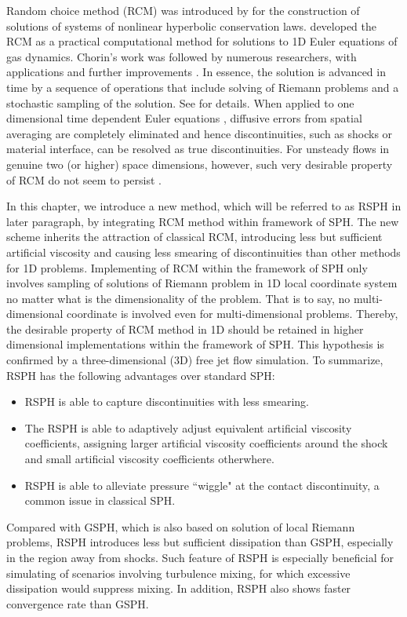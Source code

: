 Random choice method (RCM) was introduced by \citet{glimm1965solutions} for the construction of solutions of systems of nonlinear hyperbolic conservation laws. \citet{chorin1976random} developed the RCM as a practical computational method for solutions to 1D Euler equations of gas dynamics. Chorin's work was followed by numerous researchers, with applications and further improvements \citep{sod1977numerical, concus1979numerical,colella1982glimm, freistuhler1992numerical}. In essence, the solution is advanced in time by a sequence of operations that include solving of Riemann problems and a stochastic sampling of the solution. See \citep{toro2013riemann} for details. When applied to one dimensional time dependent Euler equations \citep{colella1982glimm}, diffusive errors from spatial averaging are completely eliminated and hence discontinuities, such as shocks or material interface, can be resolved as true discontinuities.
For unsteady flows in genuine two (or higher) space dimensions, however, such very desirable property of RCM do not seem to persist \citep{colella1982glimm}.

In this chapter, we introduce a new method, which will be referred to as RSPH in later paragraph, by integrating RCM method within framework of SPH. 
The new scheme inherits the attraction of classical RCM, introducing less but sufficient artificial viscosity and causing less smearing of discontinuities than other methods for 1D problems. Implementing of RCM within the framework of SPH only involves sampling of solutions of Riemann problem in 1D local coordinate system no matter what is the dimensionality of the problem. That is to say, no multi-dimensional coordinate is involved even for multi-dimensional problems. Thereby, the desirable property of RCM method in 1D should be retained in higher dimensional implementations within the framework of SPH. This hypothesis is confirmed by a three-dimensional (3D) free jet flow simulation. 
To summarize, RSPH has the following advantages over standard SPH:
\begin{itemize}
\item RSPH is able to capture discontinuities with less smearing.
\item The RSPH is able to adaptively adjust equivalent artificial viscosity coefficients, assigning larger artificial viscosity coefficients around the shock and small artificial viscosity coefficients otherwhere.
\item RSPH is able to alleviate pressure ``wiggle" at the contact discontinuity, a common issue in classical SPH.
\end{itemize}
Compared with GSPH, which is also based on solution of local Riemann problems, RSPH introduces less but sufficient dissipation than GSPH, especially in the region away from shocks. Such feature of RSPH is especially beneficial for simulating of scenarios involving turbulence mixing, for which excessive dissipation would suppress mixing. In addition, RSPH also shows faster convergence rate than GSPH.

